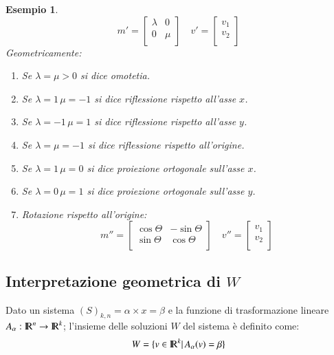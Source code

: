 \documentclass[12pt,a4paper]{article}
\theoremstyle{break}
\newtheorem{example}{Esempio}[subsection]
\newcommand\R{{\rm I\!R}}
\begin{document}
    \begin{example}
        \[
            m' =
            \begin{bmatrix}
                \lambda & 0 \\
                0 & \mu \\
            \end{bmatrix}
            \quad
            v' =
            \begin{bmatrix}
                v_1 \\
                v_2 \\
            \end{bmatrix}
        \]
        Geometricamente:
        \begin{enumerate}
            \item Se $\lambda = \mu > 0$ si dice omotetia.
            \item Se $\lambda = 1\, \mu = -1$ si dice riflessione rispetto all'asse $x$.
            \item Se $\lambda = -1 \, \mu = 1$ si dice riflessione rispetto all'asse $y$.
            \item Se $\lambda = \mu = -1$ si dice riflessione rispetto all'origine.
            \item Se $\lambda = 1 \, \mu = 0$ si dice proiezione ortogonale sull'asse $x$.
            \item Se $\lambda = 0 \, \mu = 1$ si dice proiezione ortogonale sull'asse $y$.
            \item Rotazione rispetto all'origine:
            \[
                m''=
                \begin{bmatrix}
                    \cos\Theta & -\sin\Theta \\
                    \sin\Theta & \cos\Theta \\
                \end{bmatrix}
                \quad
                v''=
                \begin{bmatrix}
                    v_1 \\
                    v_2 \\
                \end{bmatrix}     
            \]
        \end{enumerate}
    \end{example}
    \newpage
    \subsection{Interpretazione geometrica di $W$}
    Dato un sistema $(S)_{k,n} = \alpha\times x = \beta$ e la funzione di trasformazione lineare \(A_\alpha : \R^n\rightarrow \R^k\); l'insieme delle soluzioni $W$ del sistema è definito come:
    \[W = \{v\in \R^k |\, A_\alpha(v) = \beta\}\]
\end{document}
